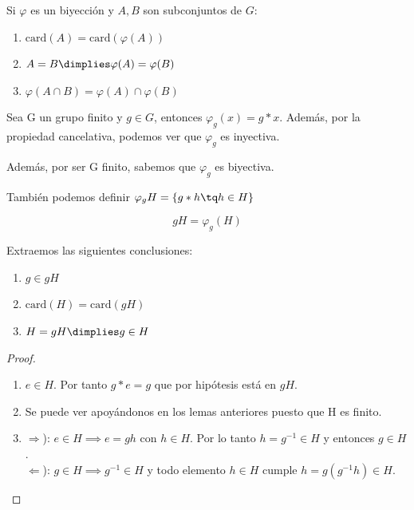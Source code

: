 \documentclass{apuntes}
\begin{document}
  \begin{lemma}
   Si $\varphi$  es un biyección y $A, B$ son subconjuntos de $G$:
   \begin{enumerate}
    \item $\text{card}(A)=\text{card}(\varphi(A))$
    \item $A=B \dimplies \varphi(A)=\varphi(B)$
    \item $\varphi(A\cap B)=\varphi(A)\cap\varphi(B)$
   \end{enumerate}
  \end{lemma}
  
  \begin{lemma}
   Sea G un grupo finito y $g \in G$, entonces $\varphi_{g}(x)=g\ast x$. Además, por la propiedad cancelativa, podemos ver que $\varphi_{g}$ es inyectiva.
   
   Además, por ser G finito, sabemos que $\varphi_{g}$ es biyectiva.
  \end{lemma}
  También podemos definir $\varphi_{g} H=\{g\ast h\tq h\in H\}$
  
  \begin{defn}
  \[  gH=\varphi_{g}(H) \]
  \end{defn}

  \begin{corol} 
  \label{corol1}
  Extraemos las siguientes conclusiones:
   \begin{enumerate}
    \item $g \in gH$
    \item $\text{card}(H)=\text{card}(gH)$
    \item $H=gH \dimplies g \in H$ 
   \end{enumerate}
  \end{corol}

  \begin{proof}
   \begin{enumerate}
    \item $e \in  H$. Por tanto $g\ast e =g$ que por hipótesis está en $gH$.
    \item Se puede ver apoyándonos en los lemas anteriores puesto que H es finito.
    \item $\Rightarrow$):  $e \in H \implies e=gh$ con $h \in H$. Por lo tanto $h=g^{-1} \in H$ y entonces $g \in H$.\\
	  $\Leftarrow$):  $g \in H \implies g^{-1}\in H$ y todo elemento $h \in H$ cumple $h=g(g^{-1}h)\in H$.
   \end{enumerate}
  \end{proof}
  
\end{document}
